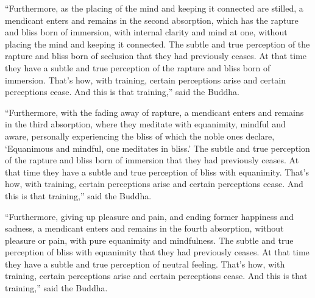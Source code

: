 \documentclass[12pt,openany]{book}%
\begin{document}
“Furthermore, as the placing of the mind and keeping it connected are stilled, a mendicant enters and remains in the second absorption, which has the rapture and bliss born of immersion, with internal clarity and mind at one, without placing the mind and keeping it connected. The subtle and true perception of the rapture and bliss born of seclusion that they had previously ceases. At that time they have a subtle and true perception of the rapture and bliss born of immersion. That’s how, with training, certain perceptions arise and certain perceptions cease. And this is that training,” said the Buddha. 

“Furthermore, with the fading away of rapture, a mendicant enters and remains in the third absorption, where they meditate with equanimity, mindful and aware, personally experiencing the bliss of which the noble ones declare, ‘Equanimous and mindful, one meditates in bliss.’ The subtle and true perception of the rapture and bliss born of immersion that they had previously ceases. At that time they have a subtle and true perception of bliss with equanimity. That’s how, with training, certain perceptions arise and certain perceptions cease. And this is that training,” said the Buddha. 

“Furthermore, giving up pleasure and pain, and ending former happiness and sadness, a mendicant enters and remains in the fourth absorption, without pleasure or pain, with pure equanimity and mindfulness. The subtle and true perception of bliss with equanimity that they had previously ceases. At that time they have a subtle and true perception of neutral feeling. That’s how, with training, certain perceptions arise and certain perceptions cease. And this is that training,” said the Buddha. 
\end{document}

